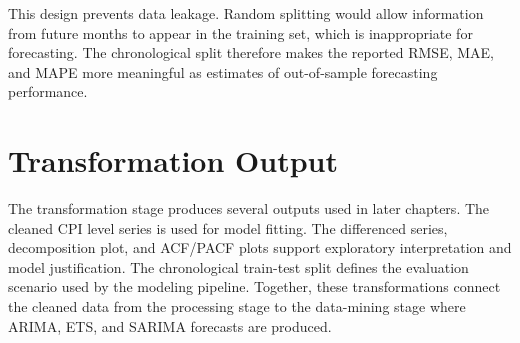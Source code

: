 This design prevents data leakage. Random splitting would allow information from future months to appear in the training set, which is inappropriate for forecasting. The chronological split therefore makes the reported RMSE, MAE, and MAPE more meaningful as estimates of out-of-sample forecasting performance.

\section{Transformation Output}

The transformation stage produces several outputs used in later chapters. The cleaned CPI level series is used for model fitting. The differenced series, decomposition plot, and ACF/PACF plots support exploratory interpretation and model justification. The chronological train-test split defines the evaluation scenario used by the modeling pipeline. Together, these transformations connect the cleaned data from the processing stage to the data-mining stage where ARIMA, ETS, and SARIMA forecasts are produced.
